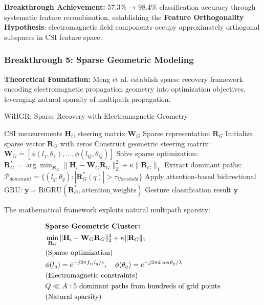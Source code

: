 \documentclass[journal]{IEEEtran}
\begin{document}
\textbf{Breakthrough Achievement:} 57.3\% → 98.4\% classification accuracy through systematic feature recombination, establishing the \textbf{Feature Orthogonality Hypothesis}: electromagnetic field components occupy approximately orthogonal subspaces in CSI feature space.

\subsubsection{Breakthrough 5: Sparse Geometric Modeling}

\textbf{Theoretical Foundation:} Meng et al. \cite{meng2021wihgr} establish sparse recovery framework encoding electromagnetic propagation geometry into optimization objectives, leveraging natural sparsity of multipath propagation.

\begin{algorithm}[h]
\caption{WiHGR: Sparse Recovery with Electromagnetic Geometry}
\label{alg:wihgr_sparse}
\begin{algorithmic}[1]
\REQUIRE CSI measurements $\mathbf{H}_i$, steering matrix $\mathbf{W}_G$
\ENSURE Sparse representation $\mathbf{R}_G$
\STATE Initialize sparse vector $\mathbf{R}_G$ with zeros
\STATE Construct geometric steering matrix: $\mathbf{W}_G = [\phi(l_1, \theta_1), \ldots, \phi(l_Q, \theta_Q)]$
\STATE Solve sparse optimization: $\mathbf{R}_G^* = \arg\min_{\mathbf{R}_G} \|\mathbf{H}_i - \mathbf{W}_G \mathbf{R}_G\|_2^2 + \kappa \|\mathbf{R}_G\|_1$
\STATE Extract dominant paths: $\mathcal{P}_{dominant} = \{(l_q, \theta_q) : |\mathbf{R}_G^*(q)| > \tau_{threshold}\}$
\STATE Apply attention-based bidirectional GRU: $\mathbf{y} = \text{BiGRU}(\mathbf{R}_G^*, \text{attention\_weights})$
\RETURN Gesture classification result $\mathbf{y}$
\end{algorithmic}
\end{algorithm}

The mathematical framework exploits natural multipath sparsity:

\begin{align}
&\hspace{2em} \text{\textbf{Sparse Geometric Cluster:}} \quad &  \nonumber \\
&\hspace{2em} \min_{\mathbf{R}_G} \|\mathbf{H}_i - \mathbf{W}_G \mathbf{R}_G\|_2^2 + \kappa \|\mathbf{R}_G\|_1 \quad \nonumber \\ 
&\hspace{2em} \text{(Sparse optimization)} \label{eq:sparse_optimization_v4} \\
&\hspace{2em} \phi(l_q) = e^{-j2\pi f_{ij} l_q / c}, \quad \phi(\theta_q) = e^{-j2\pi d \cos\theta_q / \lambda} \quad \nonumber \\ 
&\hspace{2em}  \text{(Electromagnetic constraints)} \label{eq:phase_constraints_v4} \\
&\hspace{2em} Q \ll A: \text{5 dominant paths from hundreds of grid points} \quad \nonumber \\ 
&\hspace{2em} \text{(Natural sparsity)} \label{eq:natural_sparsity_v4}
\end{align}
\end{document}
